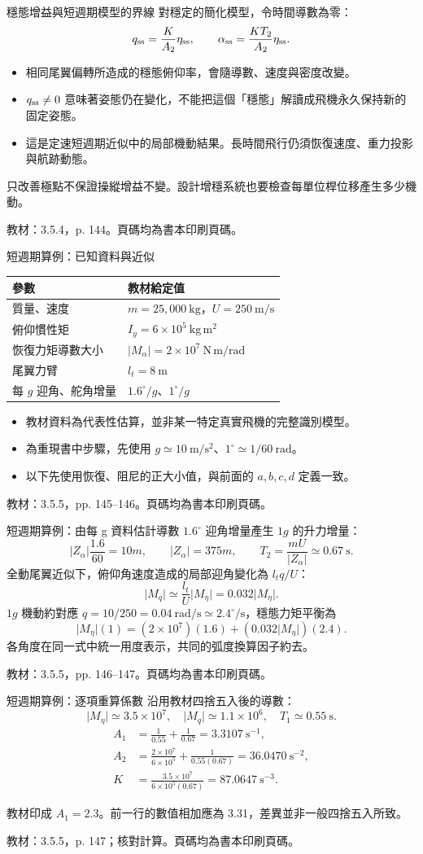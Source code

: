 \documentclass[aspectratio=169,11pt]{beamer}
\newcommand{\src}[1]{\par\vfill{\scriptsize\color{teal}教材：#1。頁碼均為書本印刷頁碼。}}
\newcommand{\slide}[3]{\begin{frame}[t]{#1}#3\src{#2}\end{frame}}
\newcommand{\bi}{\begin{itemize}\setlength{\itemsep}{5pt}}
\newcommand{\ei}{\end{itemize}}
\newcommand{\key}[1]{\par\medskip{\color{teal}\bfseries #1}\par\smallskip}
\begin{document}
\slide{穩態增益與短週期模型的界線}{3.5.4，p. 144}{
對穩定的簡化模型，令時間導數為零：
\[q_{\rm ss}=\frac{K}{A_2}\eta_{\rm ss},\qquad
\alpha_{\rm ss}=\frac{KT_2}{A_2}\eta_{\rm ss}.\]
\bi
\item 相同尾翼偏轉所造成的穩態俯仰率，會隨導數、速度與密度改變。
\item $q_{\rm ss}\ne0$ 意味著姿態仍在變化，不能把這個「穩態」解讀成飛機永久保持新的固定姿態。
\item 這是定速短週期近似中的局部機動結果。長時間飛行仍須恢復速度、重力投影與航跡動態。
\ei
\key{控制連結}只改善極點不保證操縱增益不變。設計增穩系統也要檢查每單位桿位移產生多少機動。
}
\slide{短週期算例：已知資料與近似}{3.5.5，pp. 145--146}{
\small
\begin{tabular}{ll}
\toprule 參數 & 教材給定值\\\midrule
質量、速度 & $m=25{,}000\ \mathrm{kg}$，$U=250\ \mathrm{m/s}$\\
俯仰慣性矩 & $I_y=6\times10^5\ \mathrm{kg\,m^2}$\\
恢復力矩導數大小 & $\lvert M_\alpha\rvert=2\times10^7\ \mathrm{N\,m/rad}$\\
尾翼力臂 & $l_t=8\ \mathrm{m}$\\
每 $g$ 迎角、舵角增量 & $1.6^\circ/g$、$1^\circ/g$\\\bottomrule
\end{tabular}
\bi
\item 教材資料為代表性估算，並非某一特定真實飛機的完整識別模型。
\item 為重現書中步驟，先使用 $g\simeq10\ \mathrm{m/s^2}$、$1^\circ\simeq1/60\ \mathrm{rad}$。
\item 以下先使用恢復、阻尼的正大小值，與前面的 $a,b,c,d$ 定義一致。
\ei
}
\slide{短週期算例：由每 g 資料估計導數}{3.5.5，pp. 146--147}{
\small
$1.6^\circ$ 迎角增量產生 $1g$ 的升力增量：
\[\lvert Z_\alpha\rvert\frac{1.6}{60}=10m,\qquad
\lvert Z_\alpha\rvert=375m,\qquad
T_2=\frac{mU}{\lvert Z_\alpha\rvert}\simeq0.67\ \mathrm{s}.\]
全動尾翼近似下，俯仰角速度造成的局部迎角變化為 $l_tq/U$：
\[\lvert M_q\rvert\simeq\frac{l_t}{U}\lvert M_\eta\rvert
=0.032\lvert M_\eta\rvert.\]
$1g$ 機動約對應 $q=10/250=0.04\ \mathrm{rad/s}\simeq2.4^\circ/\mathrm{s}$，穩態力矩平衡為
\[\lvert M_\eta\rvert(1)
=(2\times10^7)(1.6)+(0.032\lvert M_\eta\rvert)(2.4).\]
各角度在同一式中統一用度表示，共同的弧度換算因子約去。
}
\slide{短週期算例：逐項重算係數}{3.5.5，p. 147；核對計算}{
\small
沿用教材四捨五入後的導數：
\[\lvert M_\eta\rvert\simeq3.5\times10^7,\quad
\lvert M_q\rvert\simeq1.1\times10^6,\quad T_1\simeq0.55\ \mathrm{s}.\]
\[\begin{aligned}
A_1&=\frac1{0.55}+\frac1{0.67}=\boxed{3.3107\ \mathrm{s^{-1}}},\\
A_2&=\frac{2\times10^7}{6\times10^5}+\frac1{0.55(0.67)}
=\boxed{36.0470\ \mathrm{s^{-2}}},\\
K&=\frac{3.5\times10^7}{6\times10^5(0.67)}=\boxed{87.0647\ \mathrm{s^{-3}}}.
\end{aligned}\]
\key{已確認的算術問題}教材印成 $A_1=2.3$。前一行的數值相加應為 3.31，差異並非一般四捨五入所致。
}
\end{document}

